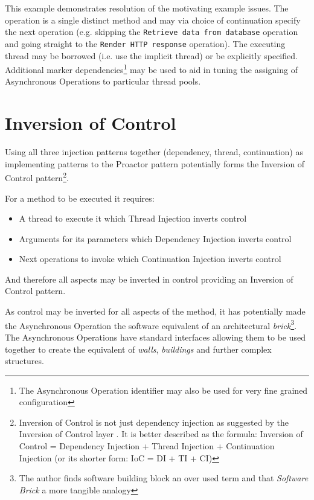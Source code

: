 \documentclass[prodmode]{style/acmlarge}
\begin{document}
This example demonstrates resolution of the motivating example issues.  The
operation is a single distinct method and may via choice of continuation specify
the next operation (e.g. skipping the \texttt{Retrieve data from database}
operation and going straight to the \texttt{Render HTTP response} operation).
The executing thread may be borrowed (i.e. use the implicit thread) or be
explicitly specified.  Additional marker dependencies\footnote{The Asynchronous
Operation identifier may also be used for very fine grained configuration} may
be used to aid in tuning the assigning of Asynchronous Operations to particular
thread pools.


\section{Inversion of Control}

Using all three injection patterns together (dependency, thread, continuation)
as implementing patterns to the Proactor pattern potentially forms the Inversion
of Control pattern\footnote{Inversion of Control is not just dependency
injection as suggested by the Inversion of Control layer \cite{ioc}.  It is
better described as the formula: Inversion of Control = Dependency Injection +
Thread Injection + Continuation Injection (or its shorter form: IoC = DI + TI +
CI)}.

For a method to be executed it requires:
\begin{itemize}
  \item A thread to execute it which Thread Injection inverts control
  \item Arguments for its parameters which Dependency Injection inverts control
  \item Next operations to invoke which Continuation Injection inverts control
\end{itemize}

And therefore all aspects may be inverted in control providing an Inversion of
Control pattern.

As control may be inverted for all aspects of the method, it has potentially
made the Asynchronous Operation the software equivalent of an architectural
\textit{brick}\footnote{The author finds software building block an over used
term and that \textit{Software Brick} a more tangible analogy}.  The
Asynchronous Operations have standard interfaces allowing them to be used
together to create the equivalent of \textit{walls}, \textit{buildings} and
further complex structures.
\end{document}
